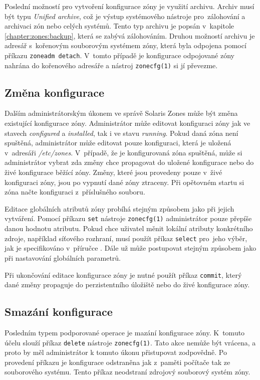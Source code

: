Poslední možností pro vytvoření konfigurace zóny je využití archivu. Archiv musí být typu \textit{Unified archive}, což je
výstup systémového nástroje pro~zálohování a archivaci zón nebo celých systémů. Tento typ archivu je popsán v~kapitole
\ref{chapter:zones:backup}, která se zabývá zálohováním. Druhou možností archivu je adresář s~kořenovým souborovým systémem
zóny, která byla odpojena pomocí příkazu \verb|zoneadm detach|. V~tomto případě je konfigurace odpojované zóny nahrána do 
kořenového adresáře a nástroj \verb|zonecfg(1)| si jí převezme.
\subsection{Změna konfigurace}
\label{chapter:zones:configuration:editing}
Dalším administrátorským úkonem ve správě Solaris Zones může být změna existující konfigurace zóny. Administrátor může editovat
konfiguraci zóny jak ve stavech \textit{configured} a \textit{installed}, tak i ve stavu \textit{running}. Pokud daná zóna není spuštěná,
administrátor může editovat pouze konfiguraci, která je uložená v~adresáři \textit{/etc/zones}. V~případě, že je konfigurovaná zóna spuštěná,
může si administrátor vybrat zda změny chce propagovat do uložené konfigurace nebo do živé konfigurace běžící zóny. 
Změny, které jsou provedeny pouze v~živé konfiguraci zóny, jsou po vypnutí dané zóny ztraceny. Při opětovném startu si zóna
načte konfiguraci z~příslušného souboru.

Editace globálních atributů zóny probíhá stejným způsobem jako při jejich vytváření. Pomocí příkazu \verb|set| nástroje
\verb|zonecfg(1)| administrátor pouze přepíše danou hodnotu atributu. Pokud chce uživatel měnit lokální atributy konkrétního zdroje,
například síťového rozhraní, musí použít příkaz \verb|select| pro~jeho výběr, jak je specifikováno v~příručce \cite{oracle:solaris:zones:modify}.
Dále už může postupovat stejným způsobem jako při nastavování globálních parametrů.

Při ukončování editace konfigurace zóny je nutné použít příkaz \verb|commit|, který dané změny propaguje do perzistentního 
úložiště nebo do živé konfigurace zóny.
\subsection{Smazání konfigurace}
\label{chapter:zones:configuration:deleting}
Posledním typem podporované operace je mazání konfigurace zóny. K~tomuto účelu slouží příkaz \verb|delete| nástroje
\verb|zonecfg(1)|. Tato akce nemůže být vrácena, a proto by měl administrátor k tomuto úkonu přistupovat zodpovědně. Po provedení
příkazu je konfigurace odstraněna jak z~paměti počítače tak ze souborového systému. Tento příkaz neodstraní zdrojový souborový
systém zóny.
